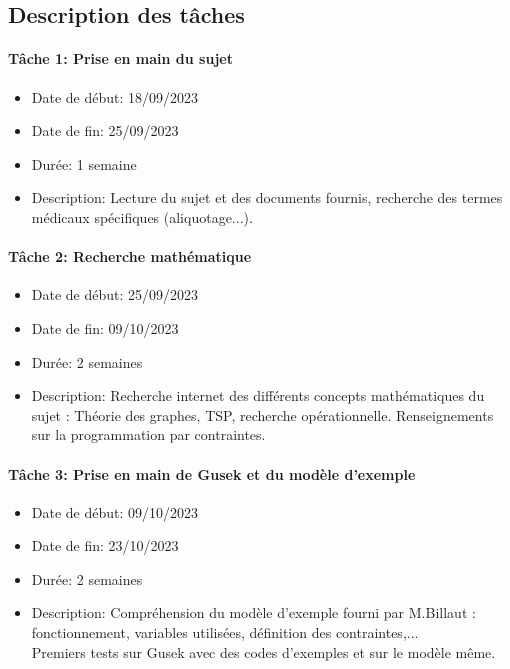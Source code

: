 \documentclass{polytech/polytech}
\numberwithin{figure}{chapter}
\begin{document}
\begin{appendix}
\section{Description des tâches}

\paragraph{Tâche 1: Prise en main du sujet}

\begin{itemize}
    \item Date de début: 18/09/2023
    \item Date de fin: 25/09/2023
    \item Durée: 1 semaine
    \item
        Description: Lecture du sujet et des documents fournis, recherche des termes médicaux spécifiques (aliquotage...).
\end{itemize}

\paragraph{Tâche 2: Recherche mathématique}

\begin{itemize}
    \item Date de début: 25/09/2023
    \item Date de fin: 09/10/2023
    \item Durée: 2 semaines
    \item
        Description: Recherche internet des différents concepts mathématiques du sujet : Théorie des graphes, TSP, recherche opérationnelle. Renseignements sur la programmation par contraintes.
\end{itemize}

\paragraph{Tâche 3: Prise en main de Gusek et du modèle d'exemple}

\begin{itemize}
    \item Date de début: 09/10/2023
    \item Date de fin: 23/10/2023
    \item Durée: 2 semaines
    \item
        Description: Compréhension du modèle d'exemple fourni par M.Billaut : fonctionnement, variables utilisées, définition des contraintes,...\\
        Premiers tests sur Gusek avec des codes d'exemples et sur le modèle même.
        

\end{itemize}
\end{appendix}
\end{document}
